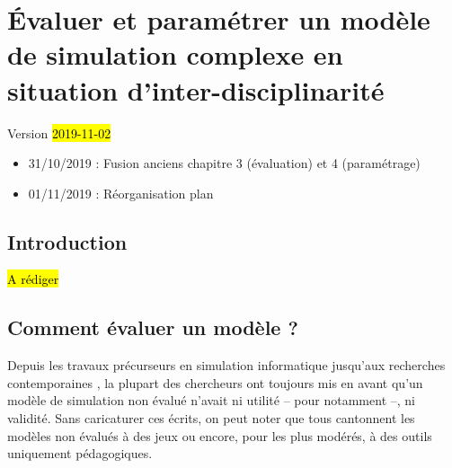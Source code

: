 \chapter{Évaluer et paramétrer un modèle de simulation complexe en situation d'inter-disciplinarité}
\label{chap:chap3}
\begin{center}
{\large Version \hl{2019-11-02}}
\end{center}
\begin{itemize}
	\item 31/10/2019 : Fusion anciens chapitre 3 (évaluation) et 4 (paramétrage)
	\item 01/11/2019 : Réorganisation plan
\end{itemize}


\minitoc
\clearpage

\section*{Introduction}
\label{sec:chap3-4-intro}

\begin{center}
	\hl{A rédiger}
\end{center}


\section{Comment évaluer un modèle ?}\label{sec:evaluer-modele}

Depuis les travaux précurseurs en simulation informatique \autocite{naylor_verification_1967,hermann_validation_1967,sargent_validation_1979} jusqu'aux recherches contemporaines \autocite{amblard_evaluation_2006,banos_pour_2013,augusiak_merging_2014, rey-coyrehourcq_plateforme_2015}, la plupart des chercheurs ont toujours mis en avant qu'un modèle de simulation non évalué n'avait ni utilité -- pour \cite{naylor_verification_1967} notamment --, ni validité.
Sans caricaturer ces écrits, on peut noter que tous cantonnent les modèles non évalués à des \og jeux\fg{} ou encore, pour les plus modérés, à des outils uniquement pédagogiques.

